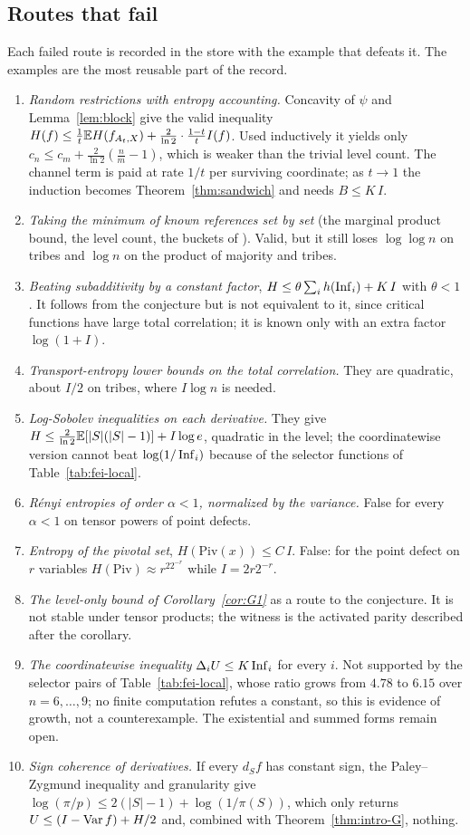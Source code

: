 \subsection{Routes that fail}
Each failed route is recorded in the store with the example that defeats it. The examples are the most reusable part of the record.
\begin{enumerate}[label=(F\arabic*)]
\item \emph{Random restrictions with entropy accounting.} Concavity of $\psi$ and Lemma~\ref{lem:block} give the valid inequality $H(f)\le\frac1t\mathbb{E} H(f_{A_t,X})+\frac2{\ln2}\cdot\frac{1-t}{t}I(f)$. Used inductively it yields only $c_n\le c_m+\frac2{\ln2}(\frac nm-1)$, which is weaker than the trivial level count. The channel term is paid at rate $1/t$ per surviving coordinate; as $t\to1$ the induction becomes Theorem~\ref{thm:sandwich} and needs $B\le K\,I$.
\item \emph{Taking the minimum of known references set by set} (the marginal product bound, the level count, the buckets of \cite{KKLMS2020}). Valid, but it still loses $\log\log n$ on tribes and $\log n$ on the product of majority and tribes.
\item \emph{Beating subadditivity by a constant factor}, $H\le\theta\sum_ih(\operatorname{Inf}_i)+K\,I$ with $\theta<1$. It follows from the conjecture but is not equivalent to it, since critical functions have large total correlation; it is known only with an extra factor $\log(1+I)$.
\item \emph{Transport-entropy lower bounds on the total correlation.} They are quadratic, about $I/2$ on tribes, where $I\log n$ is needed.
\item \emph{Log-Sobolev inequalities on each derivative.} They give $H\le\frac2{\ln2}\mathbb{E}[|S|(|S|-1)]+I\log e$, quadratic in the level; the coordinatewise version cannot beat $\log(1/\operatorname{Inf}_i)$ because of the selector functions of Table~\ref{tab:fei-local}.
\item \emph{R\'enyi entropies of order $\alpha<1$, normalized by the variance.} False for every $\alpha<1$ on tensor powers of point defects.
\item \emph{Entropy of the pivotal set}, $H(\mathrm{Piv}(x))\le C\,I$. False: for the point defect on $r$ variables $H(\mathrm{Piv})\approx r^22^{-r}$ while $I=2r2^{-r}$.
\item \emph{The level-only bound of Corollary~\ref{cor:G1}} as a route to the conjecture. It is not stable under tensor products; the witness is the activated parity described after the corollary.
\item \emph{The coordinatewise inequality} $\Delta_iU\le K\operatorname{Inf}_i$ for every $i$. Not supported by the selector pairs of Table~\ref{tab:fei-local}, whose ratio grows from $4.78$ to $6.15$ over $n=6,\dots,9$; no finite computation refutes a constant, so this is evidence of growth, not a counterexample. The existential and summed forms remain open.
\item \emph{Sign coherence of derivatives.} If every $d_Sf$ has constant sign, the Paley--Zygmund inequality and granularity give $\log(\pi/p)\le2(|S|-1)+\log(1/\pi(S))$, which only returns $U\le(I-\operatorname{Var} f)+H/2$ and, combined with Theorem~\ref{thm:intro-G}, nothing.
\end{enumerate}

